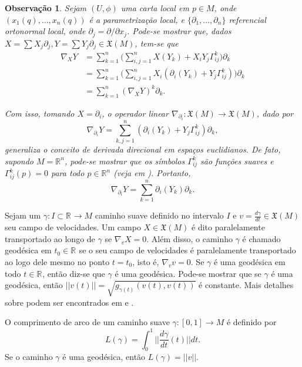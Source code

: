\documentclass[12pt]{book}
\newtheorem{observacao}[teorema]{Observação}
\newcommand{\campossuaves}[1]{\mathfrak{X}(#1)}
\newcommand{\derivada}[2]{\frac{d #1}{d #2}}
\newcommand{\intervalo}{[0,1]}
\newcommand{\norma}[1]{||#1||}
\newcommand{\normagrande}[1]{\Big|\Big|#1\Big|\Big|}
\newcommand{\real}[1]{\mathbb{R}^{#1}}
\newcommand{\reta}{\real{}}
\begin{document}
	\begin{observacao}\label{observacao_conexao_afim}
		Sejam $(U, \phi)$ uma carta local em $p\in M$, onde $(x_{1}(q), \dots, x_{n}(q))$ é a parametrização local, e $\{\partial_{1}, \dots, \partial_{n}\}$ referencial ortonormal local, onde $\partial_{j} = \partial/\partial x_{j}$. Pode-se mostrar que, dados $X=\sum X_{j}\partial_{j}, Y=\sum Y_{j}\partial_{j} \in \campossuaves{M}$, tem-se que
		$$
		\begin{aligned}
		\nabla_{X}Y &= 
		\sum_{k=1}^{n} \Big( \sum_{i,j=1}^{n} X(Y_{k}) + X_{i}Y_{j} \Gamma^{k}_{ij}\Big)\partial_{k} 
		\\
		&= 
		\sum_{k=1}^{n} \Big( \sum_{i,j=1}^{n} X_{i} (\partial_{i}(Y_{k}) + Y_{j} \Gamma^{k}_{ij})\Big)\partial_{k} 
		\\
		&= \sum_{k=1}^{n} (\nabla_{X}Y)^{k}\partial_{k}.
		\end{aligned} 
		$$
		
		Com isso, tomando $X = \partial_{i}$, o operador linear $\nabla_{\partial_{i}}: \campossuaves{M} \to \campossuaves{M}$, dado por 
		$$
		\nabla_{\partial_{i}}Y = \sum_{k,j=1}^{n}  (\partial_{i}(Y_{k}) + Y_{j} \Gamma^{k}_{ij})\partial_{k},
		$$
		generaliza o conceito de derivada direcional em espaços euclidianos. De fato, supondo $M=\real{n}$, pode-se mostrar que os símbolos $\Gamma^{k}_{ij}$ são funções suaves e $\Gamma^{k}_{ij}(p)=0$ para todo $p \in \real{n}$ (veja em \cite{manfredo_riemannian_geo}). Portanto, 
		$$
		\nabla_{\partial_{i}}Y = \sum_{k=1}^{n}  \partial_{i}(Y_{k})\partial_{k}.
		$$
	\end{observacao}
	
	Sejam um $\gamma:I\subset\reta\to M$ caminho suave definido no intervalo $I$ e $v=\derivada{\gamma}{t}\in \campossuaves{M}$ seu campo de velocidades. Um campo $X \in \campossuaves{M}$ é dito paralelamente transportado ao longo de $\gamma$ se $\nabla_{v}X=0$. Além disso, o caminho $\gamma$ é chamado geodésica em $t_{0} \in \reta$ se o seu campo de velocidades é paralelamente transportado ao logo dele mesmo no ponto $t=t_{0}$, isto é, $\nabla_{v}v=0$. Se $\gamma$ é uma geodésica em todo $t\in \reta$, então diz-se que $\gamma$ é uma geodésica. Pode-se mostrar que se $\gamma$ é uma geodésica, então $\norma{v(t)} = \sqrt{g_{\gamma(t)}(v(t), v(t))}$ é constante.
	Mais detalhes sobre podem ser encontrados em \cite{manfredo_riemannian_geo} e \cite{nakahara}.
	
	O comprimento de arco de um caminho suave $\gamma:\intervalo\to M$ é definido por 
	$$
	L(\gamma) =  \int_{0}^{1}\normagrande{\derivada{\gamma}{t}(t)}dt.
	$$
	Se o caminho $\gamma$ é uma geodésica, então $L(\gamma) =\norma{v}$.
	
\end{document}
